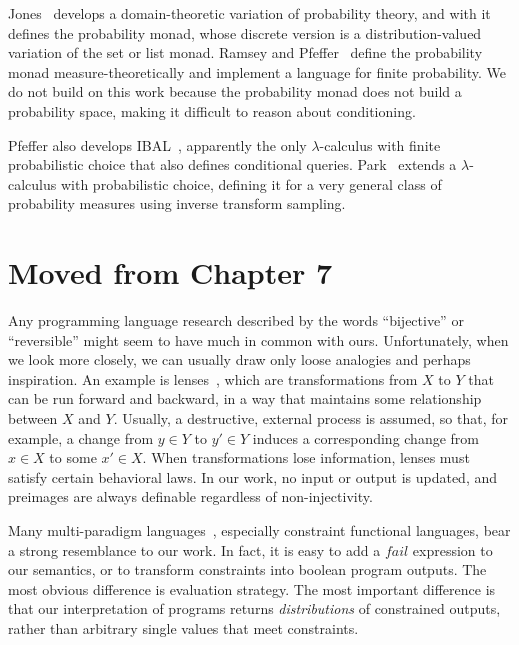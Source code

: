 Jones~\cite{cit:jones-1990thesis} develops a domain-theoretic variation of probability theory, and with it defines the probability monad, whose discrete version is a distribution-valued variation of the set or list monad. Ramsey and Pfeffer~\cite{cit:ramsey-2002popl-stochastic-short} define the probability monad measure-theoretically and implement a language for finite probability. We do not build on this work because the probability monad does not build a probability space, making it difficult to reason about conditioning.

Pfeffer also develops IBAL~\cite{cit:pfeffer-2007chapter-ibal}, apparently the only $\lambda$-calculus with finite probabilistic choice that also defines conditional queries. Park~\cite{cit:park-2008toplas-prob} extends a $\lambda$-calculus with probabilistic choice, defining it for a very general class of probability measures using inverse transform sampling.

\section{Moved from Chapter 7}

Any programming language research described by the words ``bijective'' or ``reversible'' might seem to have much in common with ours.
Unfortunately, when we look more closely, we can usually draw only loose analogies and perhaps inspiration.
An example is lenses~\cite{cit:hofmann-2012popl-edit-lenses}, which are transformations from $X$ to $Y$ that can be run forward and backward, in a way that maintains some relationship between $X$ and $Y$.
Usually, a destructive, external process is assumed, so that, for example, a change from $y \in Y$ to $y' \in Y$ induces a corresponding change from $x \in X$ to some $x' \in X$.
When transformations lose information, lenses must satisfy certain behavioral laws.
In our work, no input or output is updated, and preimages are always definable regardless of non-injectivity.

Many multi-paradigm languages~\cite{cit:hanus-2007lp-multi-paradigm}, especially constraint functional languages, bear a strong resemblance to our work.
In fact, it is easy to add a $fail$ expression to our semantics, or to transform constraints into boolean program outputs.
The most obvious difference is evaluation strategy.
The most important difference is that our interpretation of programs returns \emph{distributions} of constrained outputs, rather than arbitrary single values that meet constraints.

